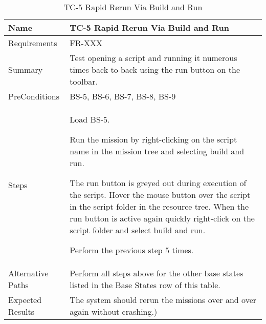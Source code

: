 \begin{table}[htbp!]
\centering
      \begin{tabular}{|p{1.05 in} |p{4.75 in} |}
      \hline
         \rowcolor[rgb]{0.8,0.8,0.8} Name & TC-5 Rapid Rerun Via Build and Run\\
         \hline
         Requirements & FR-XXX\\  \hline
         Summary & Test opening a script and running it numerous times back-to-back using the run button on
         the toolbar.\\  \hline
         PreConditions & BS-5, BS-6, BS-7, BS-8, BS-9\\     \hline
         Steps &
         \begin{compactenum}
             \item Load BS-5.
             \item Run the mission by right-clicking on the script name in the mission tree and selecting build and run.
             \item The run button is greyed out during execution of the script.  Hover the mouse
             button over the script in the script folder in the resource tree.  When the run button is active again quickly right-click on the script folder and select build and run.
             \item Perform the previous step 5 times.
         \end{compactenum}
         \\ \hline
         Alternative Paths &
         Perform all steps above for the other base states listed in the Base States row of this table.
         \\ \hline
         Expected Results & The system should rerun the missions over and over again without crashing.)\\
      \hline
      \end{tabular}
      \label{Table:TC-5}
      \caption{TC-5 Rapid Rerun Via Build and Run}
\end{table} 